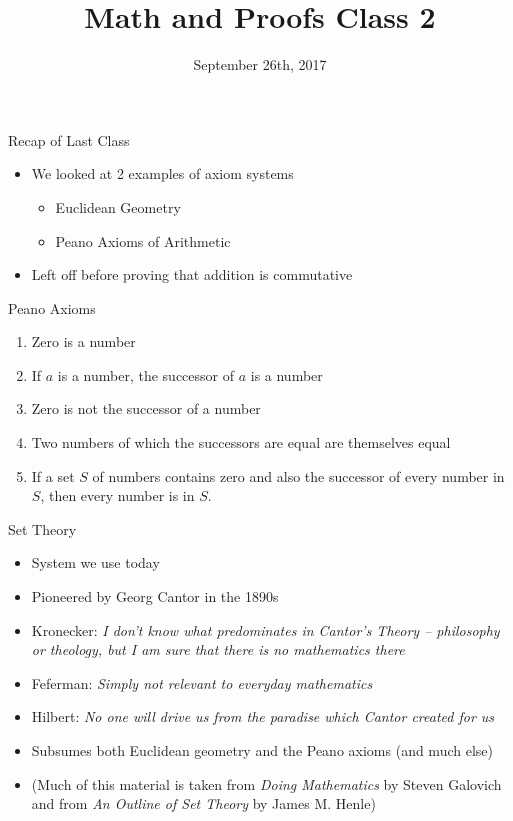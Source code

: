 \documentclass{beamer}
\begin{document}
\title[Math and Proofs]{Math and Proofs Class 2}
\date{September 26th, 2017}

\begin{frame}[plain]
\titlepage
\end{frame}

\begin{frame}{Recap of Last Class}
\begin{itemize}
\item We looked at 2 examples of axiom systems
\begin{itemize}
\item Euclidean Geometry
\item Peano Axioms of Arithmetic
\end{itemize}
\item Left off before proving that addition is commutative
\end{itemize}
\end{frame}

\begin{frame}{Peano Axioms}
\begin{enumerate}
\item Zero is a number
\item If $a$ is a number, the successor of $a$ is a number
\item Zero is not the successor of a number
\item Two numbers of which the successors are equal are themselves equal
\item If a set $S$ of numbers contains zero and also the successor of every number in $S$, then every number is in $S$.
\end{enumerate}
\end{frame}

\begin{frame}{Set Theory}
\begin{itemize}
\item System we use today
\item Pioneered by Georg Cantor in the 1890s
\item Kronecker: \textit{I don't know what predominates in Cantor's Theory -- philosophy or theology, but I am sure that there is no mathematics there}
\item Feferman: \textit{Simply not relevant to everyday mathematics}
\item Hilbert: \textit{No one will drive us from the paradise which Cantor created for us}
\item Subsumes both Euclidean geometry and the Peano axioms (and much else)
\item (Much of this material is taken from \textit{Doing Mathematics} by Steven Galovich and from \textit{An Outline of Set Theory} by James M. Henle)
\end{itemize}
\end{frame}
\end{document}
